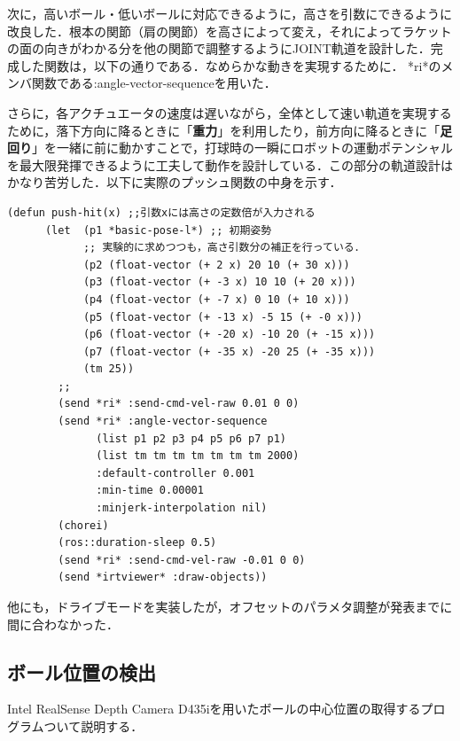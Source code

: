 \documentclass[10pt, oneside, titlepage]{ltjarticle}  %
\begin{document}
  次に，高いボール・低いボールに対応できるように，高さを引数にできるように改良した．根本の関節（肩の関節）を高さによって変え，それによってラケットの面の向きがわかる分を他の関節で調整するようにJOINT軌道を設計した．完成した関数は，以下の通りである．なめらかな動きを実現するために． *ri*のメンバ関数である:angle-vector-sequenceを用いた．

  さらに，各アクチュエータの速度は遅いながら，全体として速い軌道を実現するために，落下方向に降るときに「{\bf 重力}」を利用したり，前方向に降るときに「{\bf 足回り}」を一緒に前に動かすことで，打球時の一瞬にロボットの運動ポテンシャルを最大限発揮できるように工夫して動作を設計している．この部分の軌道設計はかなり苦労した．以下に実際のプッシュ関数の中身を示す．
  \begin{lstlisting}[basicstyle=\ttfamily]
    (defun push-hit(x) ;;引数xには高さの定数倍が入力される
      (let  (p1 *basic-pose-l*) ;; 初期姿勢
            ;; 実験的に求めつつも，高さ引数分の補正を行っている．
            (p2 (float-vector (+ 2 x) 20 10 (+ 30 x)))
            (p3 (float-vector (+ -3 x) 10 10 (+ 20 x)))
            (p4 (float-vector (+ -7 x) 0 10 (+ 10 x)))
            (p5 (float-vector (+ -13 x) -5 15 (+ -0 x)))
            (p6 (float-vector (+ -20 x) -10 20 (+ -15 x)))
            (p7 (float-vector (+ -35 x) -20 25 (+ -35 x)))
            (tm 25))
        ;; 
        (send *ri* :send-cmd-vel-raw 0.01 0 0)
        (send *ri* :angle-vector-sequence 
              (list p1 p2 p3 p4 p5 p6 p7 p1) 
              (list tm tm tm tm tm tm tm 2000)
              :default-controller 0.001
              :min-time 0.00001
              :minjerk-interpolation nil)
        (chorei)
        (ros::duration-sleep 0.5)
        (send *ri* :send-cmd-vel-raw -0.01 0 0)
        (send *irtviewer* :draw-objects))
    \end{lstlisting}
    他にも，ドライブモードを実装したが，オフセットのパラメタ調整が発表までに間に合わなかった．

\subsection{ボール位置の検出}
Intel RealSense Depth Camera D435iを用いたボールの中心位置の取得するプログラムついて説明する．
\end{document}
